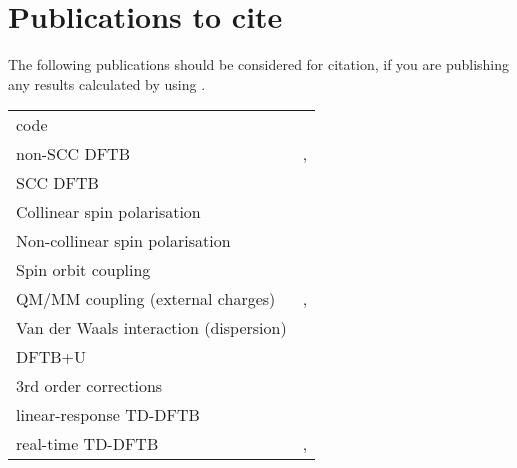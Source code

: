 \chapter{Publications to cite}

The following publications should be considered for citation, if you
are publishing any results calculated by using \dftbp.


\begin{tabular}{lr}
\dftbp{} code & \cite{dftbp-2020paper} \\
non-SCC DFTB & \cite{porezag-PRB-51-12947}, \cite{seifert-ijqc-58-185}
\\
SCC DFTB & \cite{elstner-prb-58-7260} \\
Collinear spin polarisation & \cite{koehler-cp-309-23} \\
Non-collinear spin polarisation & \cite{koehler-JPCA-111-5622} \\
Spin orbit coupling & \cite{koehler-JPCA-111-5622} \\
QM/MM coupling (external charges) & \cite{cui-jpcb-105-569},
\cite{han-ijqc-78-459} \\
Van der Waals interaction (dispersion) & \cite{elstner-jcp-114-5149} \\
DFTB+U & \cite{hourahine07}\\
3rd order corrections & \cite{yang-JPCA-111-10861} \\
linear-response TD-DFTB  & \cite{niehaus-prb-63-085108}\\
real-time TD-DFTB  & \cite{realtime1},\cite{realtime2}\\
\end{tabular}


